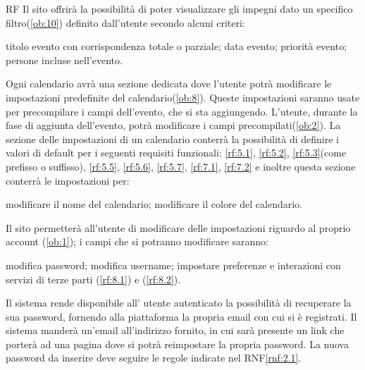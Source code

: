 \begin{listaPersonale}{RF}
	 Il sito offrirà la possibilità di poter visualizzare gli impegni dato un specifico filtro(\ref{ob:10}) definito dall'utente secondo alcuni criteri:
	\begin{listaPersonale2}{}
		 titolo evento con corrispondenza totale o parziale;
		 data evento;
		 priorità evento;
		 persone incluse nell'evento.
	\end{listaPersonale2}

	 Ogni calendario avrà una sezione dedicata dove l'utente potrà modificare le impostazioni predefinite del calendario(\ref{ob:8}). Queste impostazioni saranno usate per precompilare i campi dell'evento, che si sta aggiungendo. L'utente, durante la fase di aggiunta dell'evento, potrà modificare i campi precompilati(\ref{ob:2}). La sezione delle impostazioni di un calendario conterrà la possibilità di definire i valori di default per i seguenti requisiti funzionali: \ref{rf:5.1}, \ref{rf:5.2}, \ref{rf:5.3}(come prefisso o suffisso), \ref{rf:5.5}, \ref{rf:5.6}, \ref{rf:5.7}, \ref{rf:7.1}, \ref{rf:7.2} e inoltre questa sezione conterrà le impostazioni per:
	\begin{listaPersonale2}{}
		 modificare il nome del calendario;
		 modificare il colore del calendario.
	\end{listaPersonale2}

	 Il sito permetterà all'utente di modificare delle impostazioni riguardo al proprio account (\ref{ob:1}); i campi che si potranno modificare saranno:
	\begin{listaPersonale2}{}
		 modifica password;
		 modifica username;
		 impostare preferenze e interazioni con servizi di terze parti (\ref{rf:8.1}) e (\ref{rf:8.2}).
	\end{listaPersonale2}

	Il sistema rende disponibile all’ utente autenticato la possibilità di recuperare la sua password, fornendo alla piattaforma la propria email con cui si è registrati. Il sistema manderà un’email all'indirizzo fornito, in cui sarà presente un link che porterà ad una pagina dove si potrà reimpostare la propria password. La nuova password da inserire deve seguire le regole indicate nel RNF\ref{rnf:2.1}. %
\end{listaPersonale}